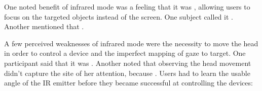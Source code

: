 One noted benefit of infrared mode was a feeling that it was , allowing users to focus on the targeted objects instead of the screen. One subject called it . Another mentioned that . 

A few perceived weaknesses of infrared mode were the necessity to move the head in order to control a device and the imperfect mapping of gaze to target. One participant said that it was . Another noted that observing the head movement didn't capture the site of her attention, because . Users had to learn the usable angle of the IR emitter before they became successful at controlling the devices: 





